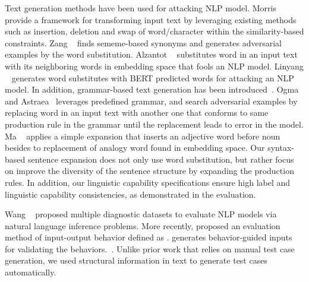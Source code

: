 Text generation methods have been used for attacking NLP model. 
Morris \textit{\etal}~\cite{morris2020textattack} provide a framework for
transforming input text by leveraging existing methods such as insertion,
deletion and swap of word/character within the similarity-based
constraints. Zang \textit{\etal}~\cite{zang2020sememepso} finds
sememe-based synonyms and generates adversarial examples by the word
substitution. Alzantot \textit{\etal}~\cite{alzantot2018genadvexp}
substitutes word in an input text with its neighboring words in
embedding space that fools an NLP model. Linyang \textit{\etal}~\cite{linyang2020bertattack} 
generates word substitutes with BERT predicted words for attacking an NLP model. 
In addition, grammar-based text generation has been introduced~\cite{udeshi2019ogma,soremekun2020astraea,maIJCAI2020mtnlp}.
Ogma~\cite{udeshi2019ogma} and Astraea~\cite{soremekun2020astraea}
leverages predefined grammar, and search adversarial examples by
replacing word in an input text with another one that conforms to same
production rule in the grammar until the replacement leads to error in
the model. Ma \textit{\etal}~\cite{maIJCAI2020mtnlp} applies a simple
expansion that inserts an adjective word before noun besides to
replacement of analogy word found in embedding space. Our syntax-based sentence expansion does not only use word substitution, but
rather focus on improve the diversity of the sentence structure by expanding the production rules. In addition, our linguistic capability specifications ensure high label and linguistic capability consistencies, as demonstrated in the evaluation.

Wang \textit{\etal}~\cite{wang2018glue, wang2019superglue} proposed
multiple diagnostic datasets to evaluate NLP models 
via natural language inference problems. More recently, \Cklst proposed an evaluation
method of input-output behavior defined as \lcs. \Cklst generates
behavior-guided inputs for validating the
behaviors.~\cite{marcoACL2020checklist}. Unlike prior work that relies on manual
test case generation, we used structural information in text to
generate test cases automatically.

